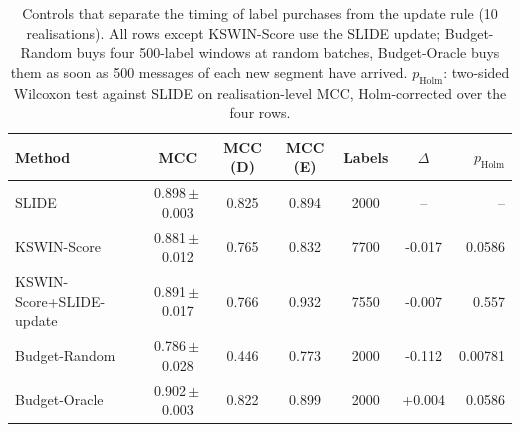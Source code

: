 \begin{table}[t]
\centering
\caption{Controls that separate the timing of label purchases from the update rule (10 realisations). All rows except KSWIN-Score use the SLIDE update; Budget-Random buys four 500-label windows at random batches, Budget-Oracle buys them as soon as 500 messages of each new segment have arrived. $p_{\mathrm{Holm}}$: two-sided Wilcoxon test against SLIDE on realisation-level MCC, Holm-corrected over the four rows.}
\label{tab:controls}
\scriptsize
\setlength{\tabcolsep}{2.5pt}
\begin{tabular}{@{}lcccccr@{}}
\toprule
Method & MCC & MCC (D) & MCC (E) & Labels & $\Delta$ & $p_{\mathrm{Holm}}$ \\
\midrule
SLIDE & 0.898\,$\pm$\,0.003 & 0.825 & 0.894 & 2000 & -- & -- \\
KSWIN-Score & 0.881\,$\pm$\,0.012 & 0.765 & 0.832 & 7700 & -0.017 & 0.0586 \\
KSWIN-Score+SLIDE-update & 0.891\,$\pm$\,0.017 & 0.766 & 0.932 & 7550 & -0.007 & 0.557 \\
Budget-Random & 0.786\,$\pm$\,0.028 & 0.446 & 0.773 & 2000 & -0.112 & 0.00781 \\
Budget-Oracle & 0.902\,$\pm$\,0.003 & 0.822 & 0.899 & 2000 & +0.004 & 0.0586 \\
\bottomrule
\end{tabular}
\end{table}
